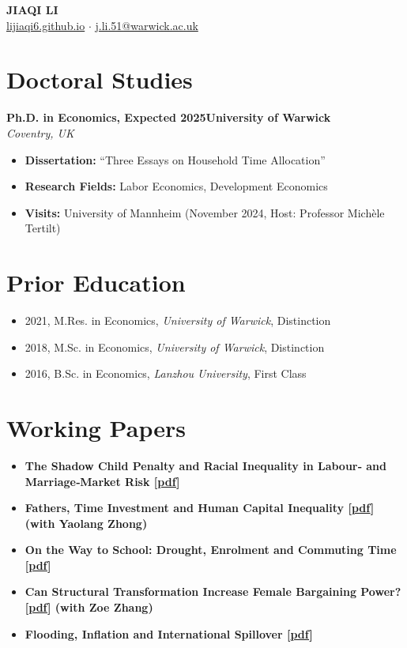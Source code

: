 \documentclass[11pt,a4paper]{article}
\newcommand{\cventry}[4]{
    \noindent\textbf{#1}\hfill\textbf{#2} \\
    \textit{#3}\hfill\textit{#4}
    \vspace{0.5em}
}
\newcommand{\cvitem}[2]{
    \item \textbf{#1} \\ #2
}
\begin{document}
\begin{center}
    {\Huge\bfseries JIAQI LI} \\
    \vspace{0.3em}
    \href{https://lijiaqi6.github.io/}{lijiaqi6.github.io} $\cdot$ \href{mailto:j.li.51@warwick.ac.uk}{j.li.51@warwick.ac.uk}
\end{center}
\vspace{1em}

\section{Doctoral Studies}
\cventry{Ph.D. in Economics, Expected 2025}{University of Warwick}{Coventry, UK}{}
\vspace{-0.5em}
\begin{itemize}[leftmargin=*, itemsep=0.2em]
    \item[] \textbf{Dissertation:} ``Three Essays on Household Time Allocation''
    \item[] \textbf{Research Fields:} Labor Economics, Development Economics
    \item[] \textbf{Visits:} University of Mannheim (November 2024, Host: Professor Michèle Tertilt)
\end{itemize}

\section{Prior Education}
\begin{itemize}[leftmargin=*, itemsep=0.2em]
    \item 2021, M.Res. in Economics, \textit{University of Warwick}, Distinction
    \item 2018, M.Sc. in Economics, \textit{University of Warwick}, Distinction
    \item 2016, B.Sc. in Economics, \textit{Lanzhou University}, First Class
\end{itemize}

\section{Working Papers}
\begin{itemize}[leftmargin=*, itemsep=0.3em]
    \cvitem{The Shadow Child Penalty and Racial Inequality in Labour‑ and Marriage‑Market Risk [\href{https://lijiaqi6.github.io/li_race.pdf}{pdf}]}{}
    \cvitem{Fathers, Time Investment and Human Capital Inequality [\href{https://lijiaqi6.github.io/Father.pdf}{pdf}] (with Yaolang Zhong)}{}
    \cvitem{On the Way to School: Drought, Enrolment and Commuting Time [\href{https://lijiaqi6.github.io/Drought.pdf}{pdf}]}{}
    \cvitem{Can Structural Transformation Increase Female Bargaining Power? [\href{https://papers.ssrn.com/sol3/papers.cfm?abstract_id=4955252}{pdf}] (with Zoe Zhang)}{}
    \cvitem{Flooding, Inflation and International Spillover [\href{https://papers.ssrn.com/sol3/papers.cfm?abstract_id=4816569}{pdf}]}{}
\end{itemize}
\end{document}
